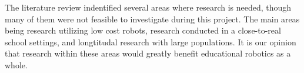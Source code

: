 
\bigskip\noindent
The literature review indentified several areas where research is needed, though many of them were not feasible to investigate during this project. 
The main areas being research utilizing low cost robots, research conducted in a close-to-real school settings, and longtitudal research with large populations. 
It is our opinion that research within these areas would greatly benefit educational robotics as a whole. 
